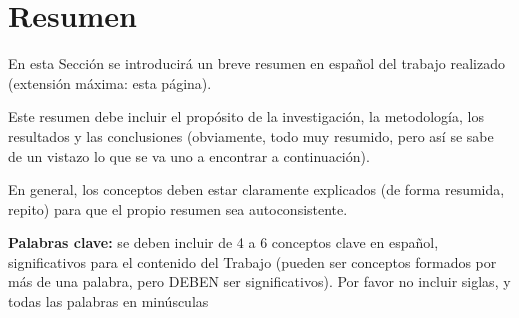 \chapter{Resumen}
En esta Sección se introducirá un breve resumen en español del trabajo realizado (extensión máxima: esta página). 
\newline

Este resumen debe incluir el propósito de la investigación, la metodología, los resultados y las conclusiones (obviamente, todo muy resumido, pero así se sabe de un vistazo lo que se va uno a encontrar a continuación). 
\newline

En general, los conceptos deben estar claramente explicados (de forma resumida, repito) para que el propio resumen sea autoconsistente.

\vspace{0.5cm}
{\bf Palabras clave:} se deben incluir de 4 a 6 conceptos clave en español, significativos para el contenido del Trabajo (pueden ser conceptos formados por más de una palabra, pero DEBEN ser significativos). Por favor no incluir siglas, y todas las palabras en minúsculas
